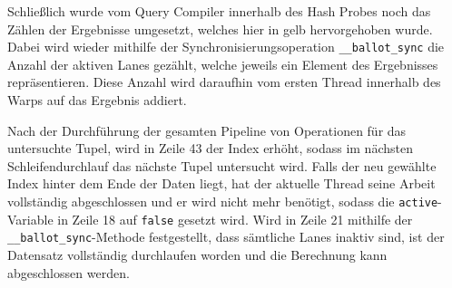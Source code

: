 Schließlich wurde vom Query Compiler innerhalb des Hash Probes noch das Zählen der Ergebnisse umgesetzt, welches hier in gelb hervorgehoben wurde.
Dabei wird wieder mithilfe der Synchronisierungsoperation \texttt{\_\_ballot\_sync} die Anzahl der aktiven Lanes gezählt, welche jeweils ein Element des Ergebnisses repräsentieren.
Diese Anzahl wird daraufhin vom ersten Thread innerhalb des Warps auf das Ergebnis addiert. 

Nach der Durchführung der gesamten Pipeline von Operationen für das untersuchte Tupel, wird in Zeile 43 der Index erhöht, sodass im nächsten Schleifendurchlauf das nächste Tupel untersucht wird.
Falls der neu gewählte Index hinter dem Ende der Daten liegt, hat der aktuelle Thread seine Arbeit vollständig abgeschlossen und er wird nicht mehr benötigt, sodass die \texttt{active}-Variable in Zeile 18 auf \texttt{false} gesetzt wird.
Wird in Zeile 21 mithilfe der \texttt{\_\_ballot\_sync}-Methode festgestellt, dass sämtliche Lanes inaktiv sind, ist der Datensatz vollständig durchlaufen worden und die Berechnung kann abgeschlossen werden.

\newpage

